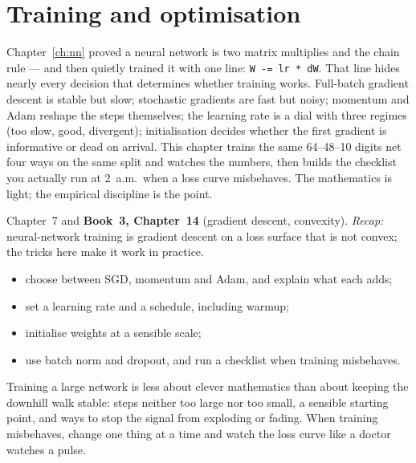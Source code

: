 \chapter{Training and optimisation}
\label{ch:training}

Chapter~\ref{ch:nn} proved a neural network is two matrix multiplies and
the chain rule --- and then quietly trained it with one line:
\texttt{W -= lr * dW}. That line hides nearly every decision that
determines whether training works. Full-batch gradient descent is
stable but slow; stochastic gradients are fast but noisy; momentum and
Adam reshape the steps themselves; the learning rate is a dial with
three regimes (too slow, good, divergent); initialisation decides
whether the first gradient is informative or dead on arrival. This
chapter trains the same 64--48--10 digits net four ways on the same
split and watches the numbers, then builds the checklist you actually
run at 2~a.m.\ when a loss curve misbehaves. The mathematics is light;
the empirical discipline is the point.

\begin{rulebox}
Chapter~7 and \textbf{Book~3, Chapter~14} (gradient descent, convexity). \emph{Recap:} neural-network training is gradient descent on a loss surface that is not convex; the tricks here make it work in practice.
\end{rulebox}
\begin{wins}
\begin{itemize}
\item choose between SGD, momentum and Adam, and explain what each adds;
\item set a learning rate and a schedule, including warmup;
\item initialise weights at a sensible scale;
\item use batch norm and dropout, and run a checklist when training misbehaves.
\end{itemize}
\end{wins}
\begin{principle}
Training a large network is less about clever mathematics than about keeping the downhill walk stable: steps neither too large nor too small, a sensible starting point, and ways to stop the signal from exploding or fading. When training misbehaves, change one thing at a time and watch the loss curve like a doctor watches a pulse.
\end{principle}

